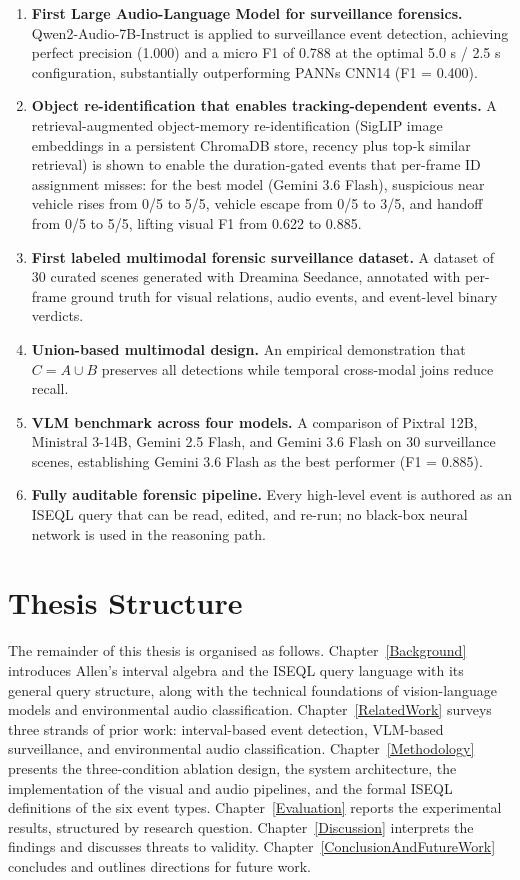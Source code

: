 \begin{enumerate}
  \item \textbf{First Large Audio-Language Model for surveillance forensics.} Qwen2-Audio-7B-Instruct is applied to surveillance event detection, achieving perfect precision (1.000) and a micro F1 of 0.788 at the optimal 5.0 s / 2.5 s configuration, substantially outperforming PANNs CNN14 (F1 = 0.400).

  \item \textbf{Object re-identification that enables tracking-dependent events.} A retrieval-augmented object-memory re-identification (SigLIP image embeddings in a persistent ChromaDB store, recency plus top-k similar retrieval) is shown to enable the duration-gated events that per-frame ID assignment misses: for the best model (Gemini 3.6 Flash), suspicious near vehicle rises from 0/5 to 5/5, vehicle escape from 0/5 to 3/5, and handoff from 0/5 to 5/5, lifting visual F1 from 0.622 to 0.885.

  \item \textbf{First labeled multimodal forensic surveillance dataset.} A dataset of 30 curated scenes generated with Dreamina Seedance, annotated with per-frame ground truth for visual relations, audio events, and event-level binary verdicts.

  \item \textbf{Union-based multimodal design.} An empirical demonstration that $C = A \cup B$ preserves all detections while temporal cross-modal joins reduce recall.

  \item \textbf{VLM benchmark across four models.} A comparison of Pixtral 12B, Ministral 3-14B, Gemini 2.5 Flash, and Gemini 3.6 Flash on 30 surveillance scenes, establishing Gemini 3.6 Flash as the best performer (F1 = 0.885).

  \item \textbf{Fully auditable forensic pipeline.} Every high-level event is authored as an ISEQL query that can be read, edited, and re-run; no black-box neural network is used in the reasoning path.
\end{enumerate}

\section{Thesis Structure}

The remainder of this thesis is organised as follows. Chapter~\ref{Background} introduces Allen's interval algebra and the ISEQL query language with its general query structure, along with the technical foundations of vision-language models and environmental audio classification. Chapter~\ref{RelatedWork} surveys three strands of prior work: interval-based event detection, VLM-based surveillance, and environmental audio classification. Chapter~\ref{Methodology} presents the three-condition ablation design, the system architecture, the implementation of the visual and audio pipelines, and the formal ISEQL definitions of the six event types. Chapter~\ref{Evaluation} reports the experimental results, structured by research question. Chapter~\ref{Discussion} interprets the findings and discusses threats to validity. Chapter~\ref{ConclusionAndFutureWork} concludes and outlines directions for future work.
